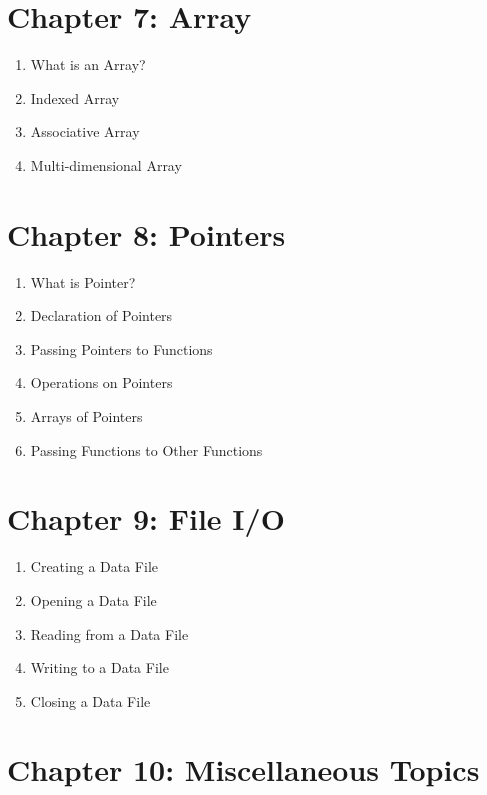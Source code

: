 \documentclass[a4paper,11pt]{article}
\begin{document}
	\section*{ Chapter 7: Array }

	\begin{enumerate}
		\item What is an Array?
		\item Indexed Array
		\item Associative Array
		\item Multi-dimensional Array
	\end{enumerate}


	\section*{ Chapter 8: Pointers }

	\begin{enumerate}
		\item What is Pointer?
		\item Declaration of Pointers
		\item Passing Pointers to Functions
		\item Operations on Pointers
		\item Arrays of Pointers
		\item Passing Functions to Other Functions
	\end{enumerate}


	\section*{ Chapter 9: File I/O }

	\begin{enumerate}
		\item Creating a Data File
		\item Opening a Data File
		\item Reading from a Data File
		\item Writing to a Data File
		\item Closing a Data File
	\end{enumerate}


	\newpage

	\section*{ Chapter 10: Miscellaneous Topics }
\end{document}
